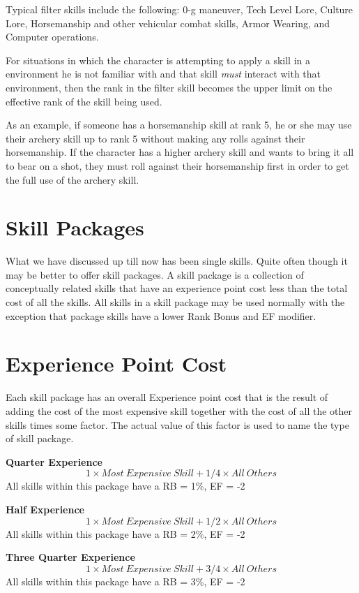Typical filter skills include the following: 0-g maneuver, Tech
Level Lore, Culture Lore, Horsemanship and other vehicular combat
skills, Armor Wearing, and Computer operations.

For situations in which the character is attempting to apply a skill
in a environment he is not familiar with and that skill {\em must }
interact with that environment, then the rank in the filter skill
becomes the upper limit on the effective rank of the skill being
used.

As an example, if someone has a horsemanship skill at rank 5, he or she
may use their archery skill up to rank 5 without making any rolls
against their horsemanship. If the character has a higher archery skill
and wants to bring it all to bear on a shot, they must roll against
their horsemanship first in order to get the full use of the archery
skill.

\section{Skill Packages}

What we have discussed up till now has been single skills.
Quite often though it may be better to offer skill packages.
A skill package is a collection of conceptually related
skills that have an experience point cost less than the total
cost of all the skills. All skills in a skill package may be
used normally with the exception that package skills have a lower
Rank Bonus and EF modifier.

\section{Experience Point Cost}

Each skill package has an overall Experience point cost that is
the result of adding the cost of the most expensive skill together
with the cost of all the other skills times some factor. The actual value
of this factor is used to name the type of skill package.

{\bf Quarter Experience}
\[ 1 \times Most\ Expensive\ Skill + 1/4 \times All\ Others \]
All skills within this package have a RB = 1\%, EF = -2

{\bf Half Experience }
\[ 1 \times Most\ Expensive\ Skill + 1/2 \times All\ Others \]
All skills within this package have a RB = 2\%, EF = -2

{\bf Three Quarter Experience}
\[ 1 \times Most\ Expensive\ Skill + 3/4 \times All\ Others \]
All skills within this package have a RB = 3\%, EF = -2

